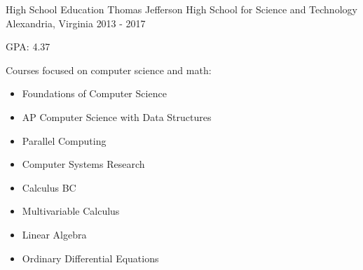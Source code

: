 \begin{cventries}
  \cventry
    {High School Education}
    {Thomas Jefferson High School for Science and Technology}
    {Alexandria, Virginia}
    {2013 - 2017}
    {
      \begin{cvitems}
        \item {GPA: 4.37}
        \item {Courses focused on computer science and math:}
        \vspace{-1em}
        \begin{multicols}{2}
        \begin{itemize}
            \item Foundations of Computer Science
            \item AP Computer Science with Data Structures
            \item Parallel Computing
            \item Computer Systems Research
        \end{itemize}
        \begin{itemize}
            \item Calculus BC
            \item Multivariable Calculus
            \item Linear Algebra
            \item Ordinary Differential Equations
        \end{itemize}
        \end{multicols}
        \vspace{-1em}
      \end{cvitems}
    }
\end{cventries}
